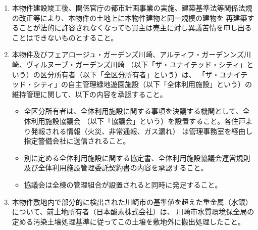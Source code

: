 \documentclass[
  luatex,
  paper=a4paper,
  fontsize=11pt,
  jafontsize=11pt,
  jlreq_notes,
]{jlreq}
\begin{document}
\begin{enumerate}
        あること（「ザ・ユナイテッド・シティ」全体概略図参照）。
  \item 本物件建設竣工後、関係官庁の都市計画事業の実施、建築基準法等関係法規の改正等により、本物件の土地上に本物件建物と同一規模の建物を
        再建築することが法的に許容されなくなっても買主は売主に対し異議苦情を申し出ることはできないものとすること。
  \item 本物件及びフェアロージュ・ガーデンズ川崎、アルティフ・ガーデンンズ川崎、ヴィルヌーブ・ガーデンズ川崎
        （以下「ザ・ユナイテッド・シティ」という）の区分所有者（以下「全区分所有者」という）は、
        「ザ・ユナイテッド・シティ」の自主管理緑地遊園施設（以下「全体利用施設」という）の維持管理に関して、以下の内容を承認すること。
          \begin{itemize}
            \item[① ] 全区分所有者は、全体利用施設に関する事項を決議する機関として、全体利用施設協議会
              （以下「協議会」という）を設置すること。各住戸より発報される情報（火災、非常通報、ガス漏れ）
              は管理事務室を経由し指定警備会社に送信されること。
            \item[② ] 別に定める全体利用施設に関する協定書、全体利用施設協議会運営規則及び全体利用施設管理委託契約書の内容を承認すること。
            \item[③ ] 協議会は全棟の管理組合が設置されると同時に発足すること。
          \end{itemize}
  \item 本物件敷地内で部分的に検出された川崎市の基準値を超えた重金属（水銀）について、前土地所有者（日本酸素株式会社）は、
        川崎市水質環境保全局の定める汚染土壌処理基準に従ってこの土壌を敷地外に搬出処理したこと。
  \end{enumerate}
  
  \newpage

\end{document}
